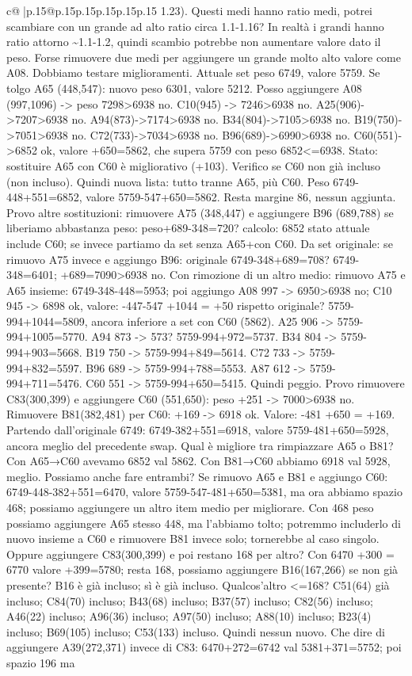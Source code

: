 \documentclass{article}
\begin{document}
{\begin{supertabular}{c@{$\;$}|p{.15\linewidth}@{}p{.15\linewidth}p{.15\linewidth}p{.15\linewidth}p{.15\linewidth}p{.15\linewidth}}
{{{1.23). Questi medi hanno ratio medi, potrei scambiare con un grande ad alto ratio circa 1.1{-}1.16? In realtà i grandi hanno ratio attorno \textasciitilde{}1.1{-}1.2, quindi scambio potrebbe non aumentare valore dato il peso. Forse rimuovere due medi per aggiungere un grande molto alto valore come A08. Dobbiamo testare miglioramenti. Attuale set peso 6749, valore 5759. Se tolgo A65 (448,547): nuovo peso 6301, valore 5212. Posso aggiungere A08 (997,1096) {-}> peso 7298>6938 no. C10(945) {-}> 7246>6938 no. A25(906){-}>7207>6938 no. A94(873){-}>7174>6938 no. B34(804){-}>7105>6938 no. B19(750){-}>7051>6938 no. C72(733){-}>7034>6938 no. B96(689){-}>6990>6938 no. C60(551){-}>6852 ok, valore +650=5862, che supera 5759 con peso 6852<=6938. Stato: sostituire A65 con C60 è migliorativo (+103). Verifico se C60 non già incluso (non incluso). Quindi nuova lista: tutto tranne A65, più C60. Peso 6749{-}448+551=6852, valore 5759{-}547+650=5862. Resta margine 86, nessun aggiunta. Provo altre sostituzioni: rimuovere A75 (348,447) e aggiungere B96 (689,788) se liberiamo abbastanza peso: peso+689{-}348=720? calcolo: 6852 stato attuale include C60; se invece partiamo da set senza A65+con C60. Da set originale: se rimuovo A75 invece e aggiungo B96: originale 6749{-}348+689=708? 6749{-}348=6401; +689=7090>6938 no. Con rimozione di un altro medio: rimuovo A75 e A65 insieme: 6749{-}348{-}448=5953; poi aggiungo A08 997 {-}> 6950>6938 no; C10 945 {-}> 6898 ok, valore: {-}447{-}547 +1044 = +50 rispetto originale? 5759{-}994+1044=5809, ancora inferiore a set con C60 (5862). A25 906 {-}> 5759{-}994+1005=5770. A94 873 {-}> 573? 5759{-}994+972=5737. B34 804 {-}> 5759{-}994+903=5668. B19 750 {-}> 5759{-}994+849=5614. C72 733 {-}> 5759{-}994+832=5597. B96 689 {-}> 5759{-}994+788=5553. A87 612 {-}> 5759{-}994+711=5476. C60 551 {-}> 5759{-}994+650=5415. Quindi peggio. Provo rimuovere C83(300,399) e aggiungere C60 (551,650): peso +251 {-}> 7000>6938 no. Rimuovere B81(382,481) per C60: +169 {-}> 6918 ok. Valore: {-}481 +650 = +169. Partendo dall'originale 6749: 6749{-}382+551=6918, valore 5759{-}481+650=5928, ancora meglio del precedente swap. Qual è migliore tra rimpiazzare A65 o B81? Con A65→C60 avevamo 6852 val 5862. Con B81→C60 abbiamo 6918 val 5928, meglio. Possiamo anche fare entrambi? Se rimuovo A65 e B81 e aggiungo C60: 6749{-}448{-}382+551=6470, valore 5759{-}547{-}481+650=5381, ma ora abbiamo spazio 468; possiamo aggiungere un altro item medio per migliorare. Con 468 peso possiamo aggiungere A65 stesso 448, ma l'abbiamo tolto; potremmo includerlo di nuovo insieme a C60 e rimuovere B81 invece solo; tornerebbe al caso singolo. Oppure aggiungere C83(300,399) e poi restano 168 per altro? Con 6470 +300 = 6770 valore +399=5780; resta 168, possiamo aggiungere B16(167,266) se non già presente? B16 è già incluso; sì è già incluso. Qualcos'altro <=168? C51(64) già incluso; C84(70) incluso; B43(68) incluso; B37(57) incluso; C82(56) incluso; A46(22) incluso; A96(36) incluso; A97(50) incluso; A88(10) incluso; B23(4) incluso; B69(105) incluso; C53(133) incluso. Quindi nessun nuovo. Che dire di aggiungere A39(272,371) invece di C83: 6470+272=6742 val 5381+371=5752; poi spazio 196 ma }}}
\end{supertabular}}
\end{document}
